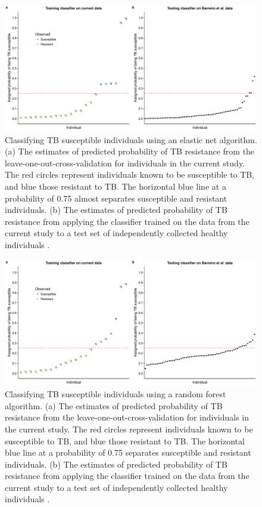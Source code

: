 \documentclass[fleqn,10pt]{wlscirep}
\begin{document}
\begin{figure}[ht]
\centering
\includegraphics[width=\linewidth]{../figure/classifier-en.pdf}
\caption{
Classifying TB susceptible individuals using an elastic net algorithm. (a) The estimates of predicted probability of TB resistance from the leave-one-out-cross-validation for individuals in the current study. The red circles represent individuals known to be susceptible to TB, and blue those resistant to TB. The horizontal blue line at a probability of 0.75 almost separates susceptible and resistant individuals. (b) The estimates of predicted probability of TB resistance from applying the classifier trained on the data from the current study to a test set of independently collected healthy individuals \cite{Barreiro2012}.
}
\label{fig:class-en}
\end{figure}

\begin{figure}[ht]
\centering
\includegraphics[width=\linewidth]{../figure/classifier-rf.pdf}
\caption{
Classifying TB susceptible individuals using a random forest algorithm. (a) The estimates of predicted probability of TB resistance from the leave-one-out-cross-validation for individuals in the current study. The red circles represent individuals known to be susceptible to TB, and blue those resistant to TB. The horizontal blue line at a probability of 0.75 separates susceptible and resistant individuals. (b) The estimates of predicted probability of TB resistance from applying the classifier trained on the data from the current study to a test set of independently collected healthy individuals \cite{Barreiro2012}.
}
\label{fig:class-rf}
\end{figure}
\end{document}
